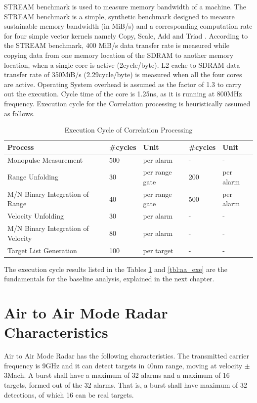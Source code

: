 STREAM benchmark\cite{McCalpin2007} is used to measure memory bandwidth of a machine. The STREAM benchmark is a simple, synthetic benchmark designed to measure sustainable memory bandwidth (in MiB/s) and a corresponding computation rate for four simple vector kernels namely Copy, Scale, Add and Triad \cite{streamDef}. According to the STREAM benchmark, 400 MiB/s data transfer rate is measured while copying data from one memory location of the SDRAM to another memory location, when a single core is active (2cycle/byte). L2 cache to SDRAM data transfer rate of 350MiB/s (2.29cycle/byte) is measured when all the four cores are active. Operating System overhead is assumed as the factor of 1.3 to carry out the execution. Cycle time of the core is 1.25ns, as it is running at 800MHz frequency. Execution cycle for the Correlation processing is heuristically assumed as follows.


\begin{table}[h!]
	\centering
	\begin{tabular}{|l|l|l||l|l|} 
	 	\hline
		\textbf{Process} & \textbf{\#cycles} & \textbf{Unit} & \textbf{\#cycles} & \textbf{Unit}  \\ \hline
		Monopulse Measurement & 500 & per alarm & - & - \\ \hline
		Range Unfolding & 30 & per range gate & 200 & per alarm \\ \hline
		M/N Binary Integration of Range & 40 & per range gate & 500 & per alarm \\ \hline
		Velocity Unfolding & 30 & per alarm & - & - \\ \hline
		M/N Binary Integration of Velocity & 80 & per alarm & - & - \\ \hline
		Target List Generation & 100 & per target & - & - \\ \hline
	\end{tabular}
	\caption{Execution Cycle of Correlation Processing \cite{fcas}}
	\label{tbl:rel_work:corr_proc_exe}
\end{table}

The execution cycle results listed in the Tables \ref{tbl:rel_work:corr_proc_exe} and \ref{tbl:aa_exe} are the fundamentals for the baseline analysis, explained in the next chapter.
 
\section{Air to Air Mode Radar Characteristics}
\label{ss:aa_mode:radar_char}
Air to Air Mode Radar has the following characteristics. The transmitted carrier frequency is 9GHz and it can detect targets in 40nm range, moving at velocity $\pm$3Mach. A burst shall have a maximum of 32 alarms and a maximum of 16 targets, formed out of the 32 alarms. That is, a burst shall have maximum of 32 detections, of which 16 can be real targets.

